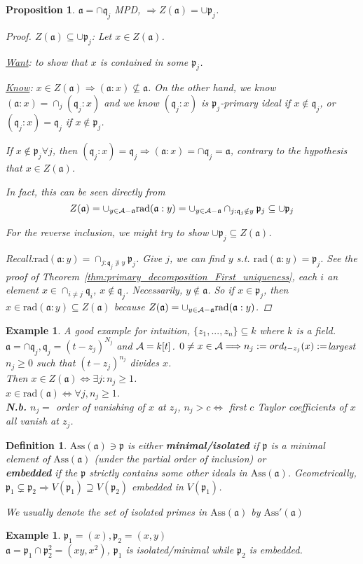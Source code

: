 \documentclass[11pt]{article}
\newtheorem{prop}[thm]{Proposition}
\newtheorem{dfn}[thm]{Definition}
\newtheorem{ex}[thm]{Example}
\newcommand{\sca}{{\mathfrak a}}
\newcommand{\scp}{{\mathfrak p}}
\newcommand{\scq}{\mathfrak q}
\newcommand{\cala}{{\cal A}}
\newcommand{\Lrta}{\Longrightarrow}
\newcommand{\Llrta}{\Longleftrightarrow}
\begin{document}
\begin{prop}\label{prop:zero-divisors}
$\sca=\cap\scq_j$ MPD,
$\Lrta Z(\sca)=\cup\scp_j$.
\begin{proof}
$Z(\sca)\subseteq \cup\scp_j$: Let $x\in Z(\sca)$. 

\underline{Want}:  to show that $x$ is contained in some $\scp_j$. 

\underline{Know}: $x\in Z(\sca)\Lrta(\sca:x)\not \subseteq \sca$. On the other hand, we know $(\sca:x)=\cap_j(\scq_j:x)$ and we know $(\scq_j:x)$ is $\scp_j$-primary ideal if $x\notin\scq_j$, or $(\scq_j:x)=\scq_j$ if $x\notin\scp_j$.

If $x\notin\scp_j\forall j$, then $(\scq_j:x)=\scq_j\Lrta (\sca:x)=\cap {\scq_j}=\sca$, contrary to the hypothesis that $x\in Z(\sca)$.

{\color{red} In fact, this can be seen directly from $$Z(\sca)=\cup_{y\in\cala-\sca}\text{rad}(\sca:y)=\cup_{y\in\cala-\sca}\cap_{j:\scq_j\notin y}\scp_j\subseteq\cup \scp_j$$ }

For the reverse inclusion, we might try to show  $\cup\scp_j\subseteq Z(\sca)$.

Recall:$\text{rad}(\sca:y)=\cap_{j:\scq_j\not \ni y}\scp_j$. Give $j$, we can find $y$ s.t. $\text{rad}(\sca:y)=\scp_j$. See the proof of Theorem~\ref{thm:primary_decomposition_First_uniqueness},  each $i$ an element $x\in\cap_{i\neq j}\scq_i$, $x\notin\scq_j$. Necessarily, $y\notin\sca$. So if $x\in \scp_j$, then $x\in  \text{rad}(\sca:y)\subseteq Z(\sca)$ because $Z(\sca)=\cup_{y\in\cala-\sca}\text{rad}(\sca:y)$.
\end{proof}
\end{prop}

\begin{ex}
A good example for intuition, $\{z_1,...,z_n\}\subseteq k$ where $k$ is a field. $\sca=\cap \scq_j, \scq_j=(t-z_j)^{N_j}$ and $\cala=k[t]$.
$0\neq x\in\cala\Lrta n_j:=ord_{t-z_j}(x):=$largest $n_j\geq 0$ such that $(t-z_j)^{n_j}$ divides $x$.\\
Then $x\in Z(\sca)\Llrta \exists j:n_j\geq 1$.\\
$x\in \text{rad}(\sca)\Llrta \forall j, n_j\geq1$.\\
\textbf{N.b.} $n_j=$ order of vanishing of $x $ at $z_j$, $n_j> c\Llrta $ first $c$ Taylor coefficients of $x$ all vanish at $z_j$.
\end{ex}
\begin{dfn}
$\text{Ass}(  \sca)\ni \scp$ is either \textbf{minimal/isolated} if $\scp$ is a minimal element of $\text{Ass}(  \sca)$ (under the partial order of inclusion) or\\
\textbf{embedded} if the $\scp$ strictly contains some other ideals in $\text{Ass}(\sca)$. Geometrically, $\scp_1\subsetneq \scp_2\Lrta V(\scp_1)\supseteq V(\scp_2)$ embedded in $V(\scp_1)$. 

We usually denote the set of isolated primes in $\text{Ass}(  \sca)$ by $\text{Ass}'(\sca)$
\end{dfn}
\begin{ex}
$\scp_1=(x), \scp_2=(x,y)$\\
$\sca=\scp_1\cap\scp_2^2=(xy,x^2)$, $\scp_1$ is isolated/minimal while $\scp_2$ is embedded.
\end{ex}
\end{document}
